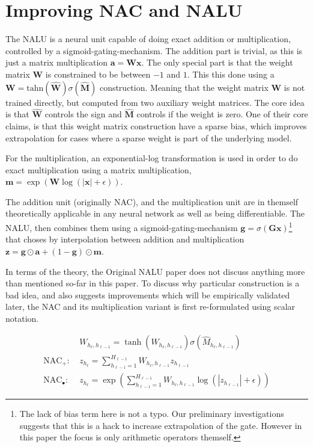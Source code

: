 \section{Improving NAC and NALU}

The NALU \cite{trask-nalu} is a neural unit capable of doing exact addition or multiplication, controlled by a sigmoid-gating-mechanism. The addition part is trivial, as this is just a matrix multiplication $\mathbf{a} = \mathbf{W}\mathbf{x}$. The only special part is that the weight matrix $\mathbf{W}$ is constrained to be between $-1$ and $1$. This this done using a $\mathbf{W} = \mathrm{tahn}({\hat{\mathbf{W}}}) \sigma({\hat{\mathbf{M}}})$ construction. Meaning that the weight matrix $\mathbf{W}$ is not trained directly, but computed from two auxiliary weight matrices. The core idea is that $\hat{\mathbf{W}}$ controls the sign and $\hat{\mathbf{M}}$ controls if the weight is zero. One of their core claims, is that this weight matrix construction have a sparse bias, which improves extrapolation for cases where a sparse weight is part of the underlying model.

For the multiplication, an exponential-log transformation is used in order to do exact multiplication using a matrix multiplication, $\mathbf{m} = \exp(\mathbf{W} \log(|\mathbf{x}| + \epsilon))$.

The addition unit (originally NAC), and the multiplication unit are in themself theoretically applicable in any neural network as well as being differentiable. The NALU, then combines them using a sigmoid-gating-mechanism $\mathbf{g} = \sigma(\mathbf{G} \mathbf{x})$\footnote{The lack of bias term here is not a typo. Our preliminary investigations suggests that this is a hack to increase extrapolation of the gate. However in this paper the focus is only arithmetic operators themself.} that choses by interpolation between addition and multiplication $\mathbf{z} = \mathbf{g} \odot \mathbf{a} + (1 - \mathbf{g}) \odot \mathbf{m}$.

In terms of the theory, the Original NALU paper \cite{trask-nalu} does not discuss anything more than mentioned so-far in this paper. To discuss why particular construction is a bad idea, and also suggests improvements which will be empirically validated later, the NAC and its multiplication variant is first re-formulated using scalar notation.

\begin{equation}
\begin{aligned}
&W_{h_\ell, h_{\ell-1}} = \tanh(\hat{W}_{h_\ell, h_{\ell-1}}) \sigma(\hat{M}_{h_\ell, h_{\ell-1}}) \\
\textrm{NAC}_+:\ &z_{h_\ell} = \sum_{h_{\ell-1}=1}^{H_{\ell-1}} W_{h_{\ell}, h_{\ell-1}} z_{h_{\ell-1}} \\
\textrm{NAC}_\bullet:\ &z_{h_\ell} = \exp\left(\sum_{h_{\ell-1}=1}^{H_{\ell-1}} W_{h_{\ell}, h_{\ell-1}} \log(|z_{h_{\ell-1}}| + \epsilon) \right)
\end{aligned}
\end{equation}

